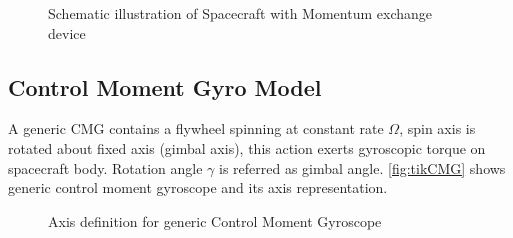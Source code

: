 \begin{figure}[!h]
    \centering
    
    \caption{Schematic illustration of Spacecraft with Momentum exchange device}
    \label{fig:tikSGCMGFrame}
\end{figure}

\subsection{Control Moment Gyro Model}
A generic CMG contains a flywheel spinning at constant rate $\displaystyle \Omega $, spin axis is rotated about fixed axis (gimbal axis), this action exerts gyroscopic torque on spacecraft body. Rotation angle $\displaystyle \gamma $ is referred as gimbal angle. \autoref{fig:tikCMG} shows generic control moment gyroscope and its axis representation.
\begin{figure}[!h]
    \centering
    
    \caption{Axis definition for generic Control Moment Gyroscope}
    \label{fig:tikCMG}
\end{figure}


